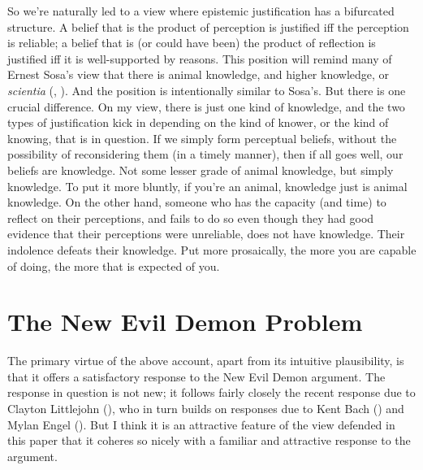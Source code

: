\documentclass[
  11pt,
  letterpaper,
  DIV=11,
  numbers=noendperiod,
  oneside]{scrartcl}
\begin{document}
So we're naturally led to a view where epistemic justification has a
bifurcated structure. A belief that is the product of perception is
justified iff the perception is reliable; a belief that is (or could
have been) the product of reflection is justified iff it is
well-supported by reasons. This position will remind many of
Ernest Sosa's view that there is animal knowledge, and higher knowledge,
or \emph{scientia} (,
). And the position is intentionally
similar to Sosa's. But there is one crucial difference. On my view,
there is just one kind of knowledge, and the two types of justification
kick in depending on the kind of knower, or the kind of knowing, that is
in question. If we simply form perceptual beliefs, without the
possibility of reconsidering them (in a timely manner), then if all goes
well, our beliefs are knowledge. Not some lesser grade of animal
knowledge, but simply knowledge. To put it more bluntly, if you're an
animal, knowledge just is animal knowledge. On the other hand, someone
who has the capacity (and time) to reflect on their perceptions, and
fails to do so even though they had good evidence that their perceptions
were unreliable, does not have knowledge. Their indolence defeats their
knowledge. Put more prosaically, the more you are capable of doing, the
more that is expected of you.

\section{The New Evil Demon Problem}\label{the-new-evil-demon-problem}

The primary virtue of the above account, apart from its intuitive
plausibility, is that it offers a satisfactory response to the New Evil
Demon argument. The response in question is not new; it follows fairly
closely the recent response due to Clayton Littlejohn
(), who in turn builds on responses
due to Kent Bach () and Mylan Engel
(). But I think it is an attractive
feature of the view defended in this paper that it coheres so nicely
with a familiar and attractive response to the argument.
\end{document}
